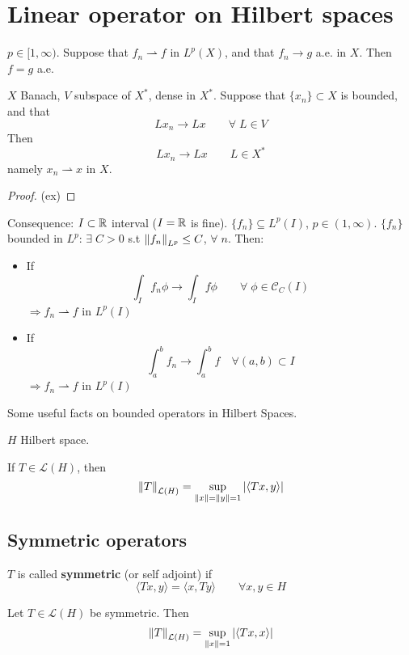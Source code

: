 \newpage
\section{Linear operator on Hilbert spaces}
\begin{proposition}
    \(p \in [1, \infty)\). Suppose that \(f_n \rightharpoonup f\) in \(L^p(X)\), and that \(f_n \to g\) a.e. in \(X\). Then \(f=g\) a.e.
\end{proposition}

\begin{proposition}
    \(X\) Banach, \(V\) subspace of \(X^*\), dense in \(X^*\). Suppose that \(\{x_n\} \subset X\) is bounded, and that 
    \[
        L x_n \to Lx \qquad \forall\; L \in V
    \]
    Then
    \[
        L x_n \to Lx \qquad L \in X^*
    \]
    namely \(x_n \rightharpoonup x\)  in \(X\).
\end{proposition}
\begin{proof}
    (ex)
\end{proof}

Consequence: \(I \subset \mathbb{R}\) interval (\(I= \mathbb{R}\) is fine). \(\{f_n\} \subseteq L^p(I)\), \(p \in (1, \infty)\). 
\(\{f_n\}\) bounded in \(L^p\): \(\exists \; C>  0\) s.t \(\norm{f_n}_{L^p} \leq C\), \(\forall \; n\). Then:

\begin{itemize}
    \item If 
    \[
        \int_I f_n \phi \to \int_I f \phi \qquad \forall \; \phi \in \mathcal{C}_C(I)
    \]
    \(\Rightarrow f_n \rightharpoonup f\)  in \(L^p(I)\)
    \item If 
    \[
        \int_a^b f_n \to \int_a^b f \quad \forall (a, b) \subset I
    \]
    \(\Rightarrow f_n \rightharpoonup f\)  in \(L^p(I)\)
\end{itemize}

Some useful facts on bounded operators in Hilbert Spaces.

\(H\) Hilbert space. 
\begin{proposition}
    If \(T \in \mathcal{L}(H)\), then
    \[
        \norm{T}_{\mathcal{L}(H)} = \sup_{\norm{x}=\norm{y}=1} \abs{\langle Tx, y\rangle  }
    \]
\end{proposition}
\subsection{Symmetric operators}
\begin{definition}
    \(T \) is called \textbf{symmetric} (or self adjoint) if 
    \[
        \langle Tx, y\rangle   = \langle x, Ty\rangle   \qquad \forall x, y \in H
    \]
\end{definition}
\begin{proposition}
    Let \(T \in \mathcal{L}(H)\) be symmetric. Then 
    \[
        \norm{T}_{\mathcal{L}(H)} = \sup_{\norm{x}= 1} \abs{\langle Tx, x\rangle  }
    \]
\end{proposition}

